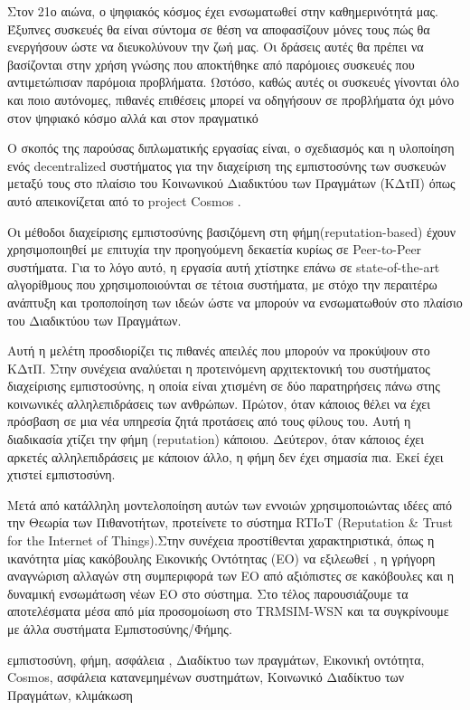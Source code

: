 \begin{abstractgr}
Στον 21ο αιώνα, ο ψηφιακός κόσμος έχει ενσωματωθεί στην καθημερινότητά μας. Έξυπνες συσκευές θα είναι σύντομα σε θέση να αποφασίζουν μόνες τους πώς θα ενεργήσουν ώστε να διευκολύνουν την ζωή μας.
Οι δράσεις αυτές θα πρέπει να βασίζονται στην χρήση γνώσης που αποκτήθηκε  από παρόμοιες συσκευές που αντιμετώπισαν    παρόμοια προβλήματα. Ωστόσο, καθώς αυτές οι συσκευές γίνονται όλο και ποιο αυτόνομες,
πιθανές επιθέσεις μπορεί να οδηγήσουν σε προβλήματα όχι μόνο στον ψηφιακό κόσμο αλλά και στον πραγματικό

Ο σκοπός της παρούσας διπλωματικής εργασίας είναι, ο σχεδιασμός και η υλοποίηση ενός decentralized συστήματος για την διαχείριση της εμπιστοσύνης των συσκευών μεταξύ τους στο πλαίσιο του
Κοινωνικού Διαδικτύου των Πραγμάτων (ΚΔτΠ)
 όπως αυτό απεικονίζεται από το project Cosmos .
 
Οι μέθοδοι διαχείρισης εμπιστοσύνης βασιζόμενη στη φήμη(reputation-based) έχουν χρησιμοποιηθεί με επιτυχία την προηγούμενη
δεκαετία κυρίως σε Peer-to-Peer συστήματα. Για το λόγο αυτό, η εργασία αυτή χτίστηκε επάνω σε 
state-of-the-art αλγορίθμους που χρησιμοποιούνται σε τέτοια συστήματα, με στόχο την περαιτέρω ανάπτυξη και τροποποίηση των
ιδεών ώστε να μπορούν να ενσωματωθούν στο πλαίσιο του Διαδικτύου των Πραγμάτων.
 
Αυτή η μελέτη προσδιορίζει τις πιθανές απειλές που μπορούν να προκύψουν στο ΚΔτΠ. Στην συνέχεια αναλύεται η προτεινόμενη αρχιτεκτονική του συστήματος διαχείρισης εμπιστοσύνης, η οποία είναι χτισμένη σε δύο παρατηρήσεις πάνω στης κοινωνικές αλληλεπιδράσεις των ανθρώπων.
 Πρώτον, όταν κάποιος θέλει να έχει πρόσβαση σε μια νέα υπηρεσία  ζητά προτάσεις από
τους φίλους του. Αυτή η διαδικασία χτίζει την φήμη (reputation) κάποιου. Δεύτερον, όταν κάποιος έχει αρκετές
αλληλεπιδράσεις με κάποιον άλλο, η φήμη δεν έχει σημασία πια. Εκεί έχει χτιστεί εμπιστοσύνη.
 
Μετά από κατάλληλη μοντελοποίηση αυτών των εννοιών χρησιμοποιώντας ιδέες από την Θεωρία των Πιθανοτήτων, προτείνετε το σύστημα RTIoT (Reputation \& Trust for the Internet of Things).Στην συνέχεια προστίθενται χαρακτηριστικά, όπως
η ικανότητα μίας κακόβουλης Εικονικής Οντότητας (ΕΟ) να εξιλεωθεί , η γρήγορη αναγνώριση 
αλλαγών στη συμπεριφορά των ΕΟ από αξιόπιστες σε κακόβουλες και η δυναμική ενσωμάτωση 
νέων ΕΟ στο σύστημα. Στο τέλος παρουσιάζουμε τα αποτελέσματα μέσα από μία προσομοίωση στο TRMSIM-WSN και τα συγκρίνουμε με άλλα συστήματα Εμπιστοσύνης/Φήμης.
	
    \begin{keywordsgr}
   εμπιστοσύνη, φήμη, ασφάλεια , Διαδίκτυο των πραγμάτων, Εικονική οντότητα, Cosmos, ασφάλεια κατανεμημένων συστημάτων, Κοινωνικό Διαδίκτυο των Πραγμάτων, κλιμάκωση
	\end{keywordsgr}
	
	
\end{abstractgr}

